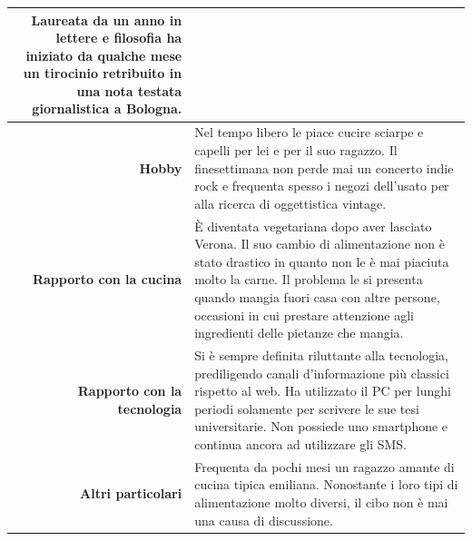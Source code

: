 \begin{table}[H]
\begin{centering}
\begin{tabular} { | r  p{12cm} | }
Laureata da un anno in lettere e filosofia ha iniziato da qualche mese
un tirocinio retribuito in una nota testata giornalistica a Bologna. \\\hline
		\textbf{Hobby} & Nel tempo libero le piace cucire sciarpe e
capelli per lei e per il suo ragazzo. Il finesettimana non perde mai un
concerto indie rock e frequenta spesso i negozi dell'usato per alla
ricerca di oggettistica vintage. \\ \hline
		\textbf{Rapporto con la cucina} & È diventata vegetariana dopo
aver lasciato Verona. Il suo cambio di alimentazione non è stato
drastico in quanto non le è mai piaciuta molto la carne. Il problema le
si presenta quando mangia fuori casa con altre persone, occasioni in cui
prestare attenzione agli ingredienti delle pietanze che mangia. \\ \hline
		\textbf{Rapporto con la tecnologia} & Si è sempre definita
riluttante alla tecnologia, prediligendo canali d'informazione più
classici rispetto al web. Ha utilizzato il PC per lunghi periodi
solamente per scrivere le sue tesi universitarie. Non possiede uno
smartphone e continua ancora ad utilizzare gli SMS.\\ \hline
		\textbf{Altri particolari} & Frequenta da pochi mesi un ragazzo
amante di cucina tipica emiliana. Nonostante i loro tipi di
alimentazione molto diversi, il cibo non è mai una causa di discussione. \\\hline
	\end{tabular}
	\end{centering}
\end{table}

